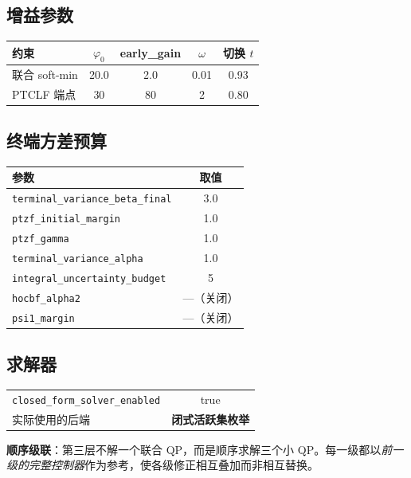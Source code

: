 \documentclass[11pt,a4paper]{ctexart}
\newcommand{\cf}[1]{\texttt{\small #1}}
\begin{document}
\subsection{增益参数}
\begin{center}
\small
\begin{tabular}{@{}lcccc@{}}
\toprule
\textbf{约束} & $\varphi_0$ & \textbf{early\_gain} & $\omega$ & \textbf{切换 }$t$ \\
\midrule
联合 soft-min & 20.0 & 2.0 & 0.01 & 0.93 \\
PTCLF 端点 & 30 & 80 & 2 & 0.80 \\
\bottomrule
\end{tabular}
\end{center}

\subsection{终端方差预算}
\begin{center}
\small
\begin{tabular}{@{}lc@{}}
\toprule
\textbf{参数} & \textbf{取值} \\
\midrule
\cf{terminal\_variance\_beta\_final} & 3.0 \\
\cf{ptzf\_initial\_margin} & 1.0 \\
\cf{ptzf\_gamma} & 1.0 \\
\cf{terminal\_variance\_alpha} & 1.0 \\
\cf{integral\_uncertainty\_budget} & 5 \\
\cf{hocbf\_alpha2} & ---（关闭） \\
\cf{psi1\_margin} & ---（关闭） \\
\bottomrule
\end{tabular}
\end{center}

\subsection{求解器}
\begin{center}
\small
\begin{tabular}{@{}lc@{}}
\toprule
\cf{closed\_form\_solver\_enabled} & true \\
实际使用的后端 & \textbf{闭式活跃集枚举} \\
\bottomrule
\end{tabular}
\end{center}

\noindent \textbf{顺序级联}：第三层不解一个联合 QP，而是顺序求解三个小 QP。每一级都以\emph{前一级的完整控制器}作为参考，使各级修正相互叠加而非相互替换。
\end{document}
